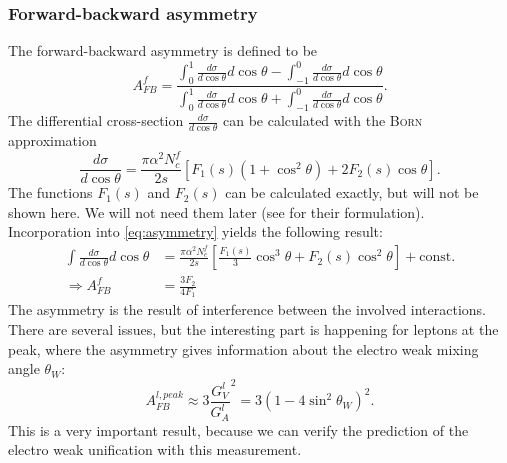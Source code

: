 \subsubsection{Forward-backward asymmetry}
\label{sub:forward_backward_asymmetry}
The forward-backward asymmetry is defined to be
\begin{equation}
    \label{eq:asymmetry}
    A^f_{FB} = \frac{\int_0^1 \frac{d\sigma}{d\cos \theta}d\cos \theta - \int_{-1}^0 \frac{d\sigma}{d\cos \theta}d\cos \theta
        }{\int_0^1 \frac{d\sigma}{d\cos \theta}d\cos \theta 
    + \int_{-1}^0 \frac{d\sigma}{d\cos \theta}d\cos \theta}.
\end{equation}
The differential cross-section $\frac{d\sigma}{d\cos \theta}$ can be calculated with the \textsc{Born} approximation
\begin{equation}
    \frac{d\sigma}{d\cos \theta} = \frac{\pi \alpha^2 N_c^f}{2s} \left[ F_1(s) (1 + \cos^2 \theta) + 2 F_2(s) \cos\theta \right].
\end{equation}
The functions $F_1(s)$ and $F_2(s)$ can be calculated exactly, but will not be shown here. We will not need them
later (see \cite{ver} for their formulation). Incorporation into \eqref{eq:asymmetry} yields the following result:
    \begin{align*}
        \label{eq:afb}
        \int \frac{d\sigma}{d\cos \theta}d\cos \theta &= \frac{\pi \alpha^2 N_c^f}{2s} 
        \left[ \frac{F_1(s)}{3} \cos^3 \theta + F_2(s) \cos^2\theta \right] + \mathrm{const}. \\
    \Rightarrow A_{FB}^f &= \frac{3 F_2}{4 F_1}
    \end{align*}
The asymmetry is the result of interference between the involved interactions. There are several issues, but the interesting
part is happening for leptons at the peak, where the asymmetry gives information about the electro weak mixing angle $\theta_W$:
\begin{equation}
    A_{FB}^{l,peak} \approx 3 \frac{G_V^l}{G_A^l}^2 = 3 ( 1 - 4 \sin^2 \theta_W ) ^2 .
\end{equation}
This is a very important result, because we can verify the prediction of the electro weak unification with this measurement.
